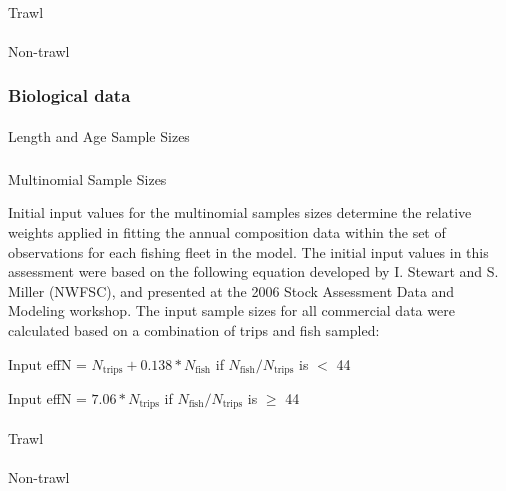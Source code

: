\documentclass[
]{scrartcl}
\makeatletter
\let\oldparagraph\paragraph
\renewcommand{\paragraph}{
    \@ifstar
      \xxxParagraphStar
      \xxxParagraphNoStar
  }
\newcommand{\xxxParagraphStar}[1]{\oldparagraph*{#1}\mbox{}}
\newcommand{\xxxParagraphNoStar}[1]{\oldparagraph{#1}\mbox{}}
\let\oldsubparagraph\subparagraph
\renewcommand{\subparagraph}{
    \@ifstar
      \xxxSubParagraphStar
      \xxxSubParagraphNoStar
  }
\newcommand{\xxxSubParagraphStar}[1]{\oldsubparagraph*{#1}\mbox{}}
\newcommand{\xxxSubParagraphNoStar}[1]{\oldsubparagraph{#1}\mbox{}}
\makeatother
\begin{document}
\paragraph{Trawl}\label{trawl-1}

\paragraph{Non-trawl}\label{non-trawl-1}

\subsubsection{Biological data}\label{biological-data}

\paragraph{Length and Age Sample
Sizes}\label{length-and-age-sample-sizes}

\subparagraph{Multinomial Sample Sizes}\label{multinomial-sample-sizes}

Initial input values for the multinomial samples sizes determine the
relative weights applied in fitting the annual composition data within
the set of observations for each fishing fleet in the model. The initial
input values in this assessment were based on the following equation
developed by I. Stewart and S. Miller (NWFSC), and presented at the 2006
Stock Assessment Data and Modeling workshop. The input sample sizes for
all commercial data were calculated based on a combination of trips and
fish sampled:

\begin{centering}

Input effN = $N_{\text{trips}} + 0.138 * N_{\text{fish}}$ if $N_{\text{fish}}/N_{\text{trips}}$ is $<$ 44

Input effN = $7.06 * N_{\text{trips}}$ if $N_{\text{fish}}/N_{\text{trips}}$ is $\geq$ 44

\end{centering}

\paragraph{Trawl}\label{trawl-2}

\paragraph{Non-trawl}\label{non-trawl-2}
\end{document}
